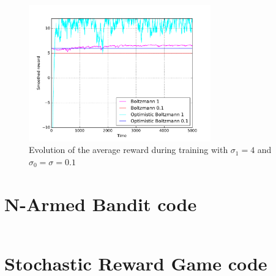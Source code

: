 \documentclass[a4paper]{article}
\begin{document}
\begin{figure}[H]
	\centering
	\includegraphics[width=0.7\textwidth]{./fig/ex2-2.pdf}
	\caption{Evolution of the average reward during training with
		$\sigma_1 = 4$ and  $\sigma_0 = \sigma = 0.1$}
	\label{ex33perf}
\end{figure}

\appendix
\section{N-Armed Bandit code}
\inputminted{python}{partone.py}

\section{Stochastic Reward Game code}
\inputminted{python}{parttwo.py}
\end{document}
